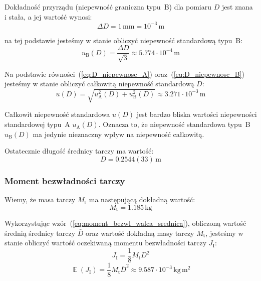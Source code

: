 \documentclass[twocolumn, a4paper, polish, 10pt]{article}
\DeclareMathOperator{\EX}{\mathbb{E}}
\begin{document}
Dokładność przyrządu (niepewność graniczna typu~B) dla pomiaru $D$ jest znana i stała, a jej wartość wynosi:
\begin{displaymath}
    \Delta D = 1 \, \mathrm{mm} = 10^{-3} \, \mathrm{m}
\end{displaymath}

na tej podstawie jesteśmy w stanie obliczyć niepewność standardową typu~B:
\begin{equation}
    u_{\mathrm{B}}(D) = \frac{\Delta D}{\sqrt{3}} \approx 5.774 \cdot 10^{-4} \, \mathrm{m}
\label{eq:D_niepewnosc_B}
\end{equation}

Na podstawie równości~(\ref{eq:D_niepewnosc_A}) oraz~(\ref{eq:D_niepewnosc_B}) jesteśmy w stanie obliczyć całkowitą niepewność standardową $D$:
\begin{displaymath}
    u(D) = \sqrt{ u_{\mathrm{A}}^2(D) + u_{\mathrm{B}}^2(D) } \approx 3.271 \cdot 10^{-3} \, \mathrm{m}
\end{displaymath}

Całkowit niepewność standardowa $u(D)$ jest bardzo bliska wartości niepewności standardowej typu~A $u_{\mathrm{A}}(D)$. Oznacza to, że niepewność standardowa typu~B $u_{\mathrm{B}}(D)$ ma jedynie nieznaczny wpływ na niepewność całkowitą.

Ostatecznie długość średnicy tarczy ma wartość:
\begin{displaymath}
    D = 0.2544(33) \, \mathrm{m}
\end{displaymath}

\subsubsection{Moment bezwładności tarczy}
Wiemy, że masa tarczy $M_{\mathrm{t}}$ ma następującą dokładną wartość:
\begin{displaymath}
    M_{\mathrm{t}} = 1.185 \, \mathrm{kg}
\end{displaymath}

Wykorzystując wzór~(\ref{eq:moment_bezwl_walca_srednica}), obliczoną wartość średnią średnicy tarczy $\bar{D}$ oraz wartość dokładną masy tarczy $M_{\mathrm{t}}$, jesteśmy w stanie obliczyć wartość oczekiwaną momentu bezwładności tarczy $J_{\mathrm{I}}$:
\begin{displaymath}
    J_{\mathrm{I}} = \frac{1}{8} M_{\mathrm{t}} D^2
\end{displaymath}
\begin{displaymath}
    \EX(J_{\mathrm{I}}) = \frac{1}{8} M_{\mathrm{t}} \bar{D}^2 \approx 9.587 \cdot  10^{-3} \, \mathrm{kg \, m^2}
\end{displaymath}
\end{document}
